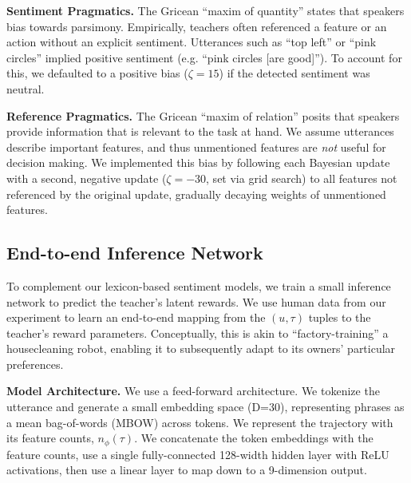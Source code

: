 \documentclass[letterpaper]{article} %
\begin{document}
\textbf{Sentiment Pragmatics.} The Gricean ``maxim of quantity'' states that speakers bias towards parsimony. Empirically, teachers often referenced a feature or an action without an explicit sentiment. Utterances such as ``top left'' or ``pink circles'' implied positive sentiment (e.g. ``pink circles [are good]''). To account for this, we defaulted to a positive bias ($\zeta = 15$) if the detected sentiment was neutral.  

\textbf{Reference Pragmatics.} The Gricean ``maxim of relation'' posits that speakers provide information that is relevant to the task at hand. We assume utterances describe important features, and thus unmentioned features are \textit{not} useful for decision making. We implemented this bias by following each Bayesian update with a second, negative update ($\zeta = -30$, set via grid search) to all features not referenced by the original update, gradually decaying weights of unmentioned features.

\subsection{End-to-end Inference Network}
\label{learned_model_desc}
To complement our lexicon-based sentiment models, we train a small inference network to predict the teacher's latent rewards. We use human data from our experiment to learn an end-to-end mapping from the $(u, \tau)$ tuples to the teacher's reward parameters. Conceptually, this is akin to ``factory-training'' a housecleaning robot, enabling it to subsequently adapt to its owners' particular preferences. 

\textbf{Model Architecture.} We use a feed-forward architecture. We tokenize the utterance and generate a small embedding space (D=30), representing phrases as a mean bag-of-words (MBOW) across tokens. We represent the trajectory with its feature counts, $n_\phi(\tau)$. We concatenate the token embeddings with the feature counts, use a single fully-connected 128-width hidden layer with ReLU activations, then use a linear layer to map down to a 9-dimension output.
\end{document}
